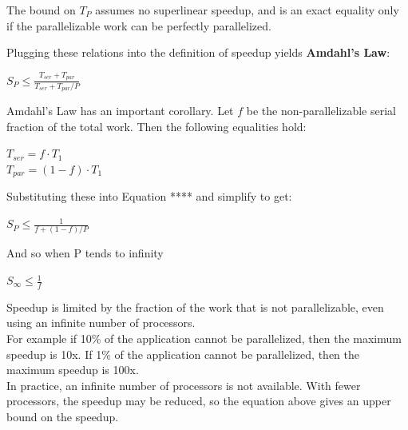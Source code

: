 The bound on \(T_{P}\) assumes no superlinear speedup, and is an exact equality only if the parallelizable work can be perfectly parallelized.

Plugging these relations into the definition of speedup yields \textbf{Amdahl’s Law}:
\begin{center}
	\(S_{P} \leq \frac{T_{ser}+T_{par}}{T_{ser}+T_{par}/P}\)
\end{center}
Amdahl’s Law has an important corollary. Let \(f\) be the non-parallelizable serial fraction of the total work. Then the following equalities hold:
\begin{center}
	\(T_{ser} = f \cdot T_{1}\)\\
	 \(T_{par} = (1-f) \cdot T_{1}\)
\end{center}

Substituting these into Equation **** and simplify to get:
\begin{center}
	\(S_{P} \leq \frac{1}{f+(1-f)/P}\)
\end{center}
And so when P tends to infinity
\begin{center}
	\(S_{\infty} \leq \frac{1}{f}\)
\end{center}

Speedup is limited by the fraction of the work that is not parallelizable, even using an infinite number
of processors.\\
For example if 10\% of the application cannot be parallelized, then the maximum speedup is 10x.
If 1\% of the application cannot be parallelized, then the maximum speedup is 100x.\\
In practice, an infinite number of processors is not available. With fewer processors, the speedup may be reduced, so the equation above gives an upper bound on the speedup.


